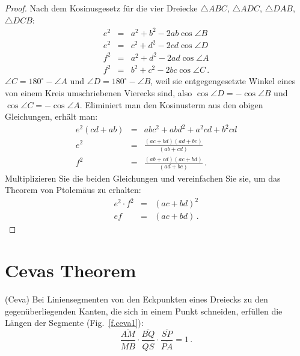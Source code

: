 \begin{proof}
Nach dem Kosinusgesetz für die vier Dreiecke $\triangle ABC$, $\triangle ADC$, $\triangle DAB$, $\triangle DCB$:
\begin{eqnarray*}
e^2 &=& a^2 + b^2 - 2ab \cos \angle B\\
e^2 &=& c^2 + d^2 - 2cd \cos \angle D\\
f^2 &=& a^2 + d^2 - 2ad \cos \angle A\\
f^2 &=& b^2 + c^2 - 2bc \cos \angle C\,.
\end{eqnarray*}
$\angle C = 180^\circ - \angle A$ und $\angle D = 180^\circ - \angle B$, weil sie entgegengesetzte Winkel eines von einem Kreis umschriebenen Vierecks sind, also $\cos \angle D = - \cos \angle B$ und $\cos \angle C = -\cos \angle A$. Eliminiert man den Kosinusterm aus den obigen Gleichungen, erhält man:
\begin{eqnarray*}
e^2(cd+ab)&=&abc^2+abd^2+a^2cd+b^2cd\\
e^2 &=& \frac{(ac+bd)(ad+bc)}{(ab+cd)}\\
f^2 &=& \frac{(ab+cd)(ac+bd)}{(ad+bc)}\,.
\end{eqnarray*}
Multiplizieren Sie die beiden Gleichungen und vereinfachen Sie sie, um das Theorem von Ptolemäus zu erhalten:
\begin{eqnarray*}
e^2\cdot f^2 &=& (ac+bd)^2\\
ef &=& (ac+bd)\,.
\end{eqnarray*}
\end{proof}


\section{Cevas Theorem}\label{a.ceva}

\begin{theorem}(Ceva)
Bei Liniensegmenten von den Eckpunkten eines Dreiecks zu den gegenüberliegenden Kanten, die sich in einem Punkt schneiden, erfüllen die Längen der Segmente (Fig.~\ref{f.ceva1}):\label{thm.ceva}
\[
\frac{\overline{AM}}{\overline{MB}}\cdot\frac{\overline{BQ}}{\overline{QS}}\cdot\frac{\overline{SP}}{\overline{PA}} = 1\,.
\]
\end{theorem}

